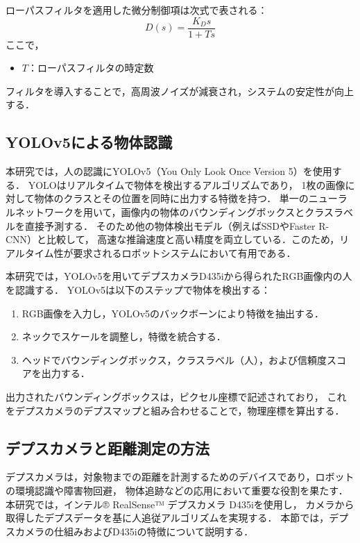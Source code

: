 ローパスフィルタを適用した微分制御項は次式で表される：
\begin{equation}
    D(s) = \frac{K_D s}{1 + T s}
    \label{eq:lowpass_filter}
\end{equation}
ここで，
\begin{itemize}
    \item $T$：ローパスフィルタの時定数
\end{itemize}

フィルタを導入することで，高周波ノイズが減衰され，システムの安定性が向上する．

\subsection{YOLOv5による物体認識}
本研究では，人の認識にYOLOv5（You Only Look Once Version 5）を使用する．
YOLOはリアルタイムで物体を検出するアルゴリズムであり，
1枚の画像に対して物体のクラスとその位置を同時に出力する特徴を持つ．
単一のニューラルネットワークを用いて，画像内の物体のバウンディングボックスとクラスラベルを直接予測する\cite{yolo}．
そのため他の物体検出モデル（例えばSSDやFaster R-CNN）と比較して，
高速な推論速度と高い精度を両立している．このため，リアルタイム性が要求されるロボットシステムにおいて有用である．

本研究では，YOLOv5を用いてデプスカメラD435iから得られたRGB画像内の人を認識する．
YOLOv5は以下のステップで物体を検出する：
\begin{enumerate}
    \item RGB画像を入力し，YOLOv5のバックボーンにより特徴を抽出する．
    \item ネックでスケールを調整し，特徴を統合する．
    \item ヘッドでバウンディングボックス，クラスラベル（人），および信頼度スコアを出力する．
\end{enumerate}

出力されたバウンディングボックスは，ピクセル座標で記述されており，
これをデプスカメラのデプスマップと組み合わせることで，物理座標を算出する．


\subsection{デプスカメラと距離測定の方法}
デプスカメラは，対象物までの距離を計測するためのデバイスであり，ロボットの環境認識や障害物回避，
物体追跡などの応用において重要な役割を果たす．
本研究では，インテル® RealSense™ デプスカメラ D435iを使用し，
カメラから取得したデプスデータを基に人追従アルゴリズムを実現する．
本節では，デプスカメラの仕組みおよびD435iの特徴について説明する．

